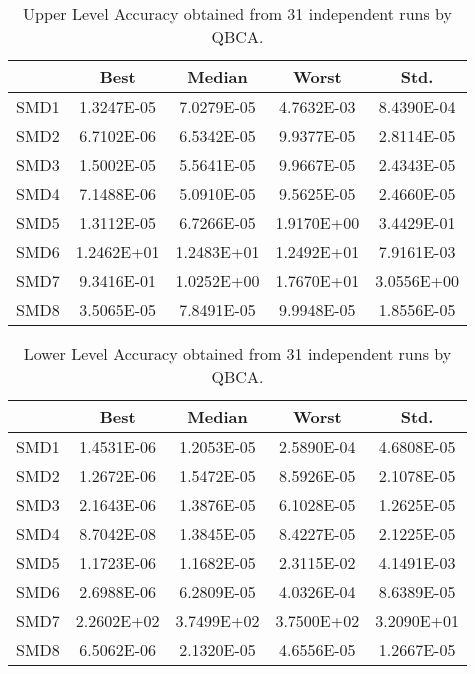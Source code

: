 \documentclass[conference]{IEEEtran}
\theoremstyle{definition}
\begin{document}
\begin{table}[htbp]
    \caption{Upper Level Accuracy obtained from 31 independent runs by QBCA.}
    \label{tab:ul-accur}
    \centering
    \begin{tabular}{ccccc}
        \hline
        & Best &  Median  &  Worst &  Std. \\ \hline
        SMD1 & 1.3247E-05 & 7.0279E-05 %
        & 4.7632E-03 & 8.4390E-04 \\ \hline 
        SMD2 & 6.7102E-06 & 6.5342E-05 %
        & 9.9377E-05 & 2.8114E-05 \\ \hline 
        SMD3 & 1.5002E-05 & 5.5641E-05 %
        & 9.9667E-05 & 2.4343E-05 \\ \hline 
        SMD4 & 7.1488E-06 & 5.0910E-05 %
        & 9.5625E-05 & 2.4660E-05 \\ \hline 
        SMD5 & 1.3112E-05 & 6.7266E-05 %
        & 1.9170E+00 & 3.4429E-01 \\ \hline 
        SMD6 & 1.2462E+01 & 1.2483E+01 %
        & 1.2492E+01 & 7.9161E-03 \\ \hline 
        SMD7 & 9.3416E-01 & 1.0252E+00 %
        & 1.7670E+01 & 3.0556E+00 \\ \hline 
        SMD8 & 3.5065E-05 & 7.8491E-05 %
        & 9.9948E-05 & 1.8556E-05 \\ \hline 
 
    \end{tabular}
\end{table}
% 
\begin{table}[htbp]
    \caption{Lower Level Accuracy obtained from 31 independent runs by QBCA.}
    \label{tab:ll-accur}
    \centering
    \begin{tabular}{ccccc}
        \hline
        & Best &  Median  &  Worst &  Std. \\ \hline

        SMD1 & 1.4531E-06 & 1.2053E-05 %
        & 2.5890E-04 & 4.6808E-05 \\ \hline 
        SMD2 & 1.2672E-06 & 1.5472E-05 %
        & 8.5926E-05 & 2.1078E-05 \\ \hline 
        SMD3 & 2.1643E-06 & 1.3876E-05 %
        & 6.1028E-05 & 1.2625E-05 \\ \hline 
        SMD4 & 8.7042E-08 & 1.3845E-05 %
        & 8.4227E-05 & 2.1225E-05 \\ \hline 
        SMD5 & 1.1723E-06 & 1.1682E-05 %
        & 2.3115E-02 & 4.1491E-03 \\ \hline 
        SMD6 & 2.6988E-06 & 6.2809E-05 %
        & 4.0326E-04 & 8.6389E-05 \\ \hline 
        SMD7 & 2.2602E+02 & 3.7499E+02 %
        & 3.7500E+02 & 3.2090E+01 \\ \hline 
        SMD8 & 6.5062E-06 & 2.1320E-05 %
        & 4.6556E-05 & 1.2667E-05 \\ \hline 

    \end{tabular}
\end{table}
\end{document}
